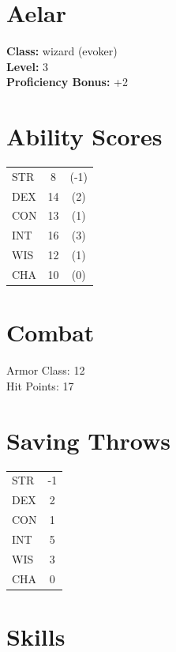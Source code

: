 \documentclass[11pt]{article}
\begin{document}
\section*{ Aelar }

\textbf{Class:} wizard (evoker) \\
\textbf{Level:} 3 \\
\textbf{Proficiency Bonus:} +2

\section*{Ability Scores}

\begin{tabular}{l c c}
STR & 8 & (-1) \\
DEX & 14 & (2) \\
CON & 13 & (1) \\
INT & 16 & (3) \\
WIS & 12 & (1) \\
CHA & 10 & (0) \\
\end{tabular}

\section*{Combat}

Armor Class: 12 \\
Hit Points: 17

\section*{Saving Throws}

\begin{tabular}{l c}
STR & -1 \\
DEX & 2 \\
CON & 1 \\
INT & 5 \\
WIS & 3 \\
CHA & 0 \\
\end{tabular}

\section*{Skills}
\end{document}
